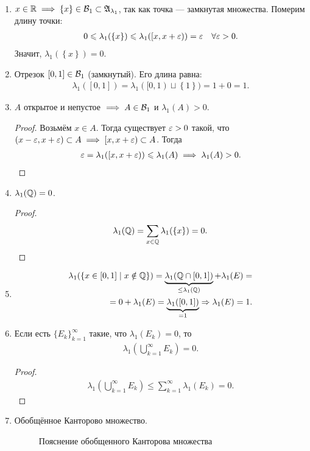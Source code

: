 \begin{exmpl}\
 \begin{enumerate}
  \item $x \in \mathbb{R} \implies \left\{ x \right\} \in \mathcal{B}_1 \subset \mathfrak{A}_{\lambda_1}$, так как точка --- замкнутая множества. Померим длину точки:
   \begin{align*}
    0 \leqslant \lambda_1(\left\{ x \right\}) \leqslant \lambda_1([x, x + \varepsilon)) = \varepsilon \quad \forall \varepsilon > 0
   .\end{align*} Значит, $\lambda_1(\left\{ x \right\}) = 0$.
  \item Отрезок $[0, 1] \in \mathcal{B}_1$ (замкнутый). Его длина равна:
   \begin{align*}
    \lambda_1([0,1]) = \lambda_1([0, 1) \sqcup \left\{ 1 \right\}) = 1 + 0 = 1
   .\end{align*}
  \item $A$ открытое и непустое $ \implies A \in \mathcal{B}_1$ и $\lambda_1(A) > 0$.
   \begin{proof}
    Возьмём $x \in A$. Тогда существует $\varepsilon > 0$ такой, что $(x - \varepsilon, x + \varepsilon) \subset A \implies [x, x + \varepsilon) \subset A$. Тогда
    \begin{align*}
     \varepsilon = \lambda_1( [x, x + \varepsilon) ) \leqslant \lambda_1(A) \implies \lambda_1(A) > 0
    .\end{align*}
   \end{proof}
  \item $\lambda_1(\mathbb{Q}) = 0$.
   \begin{proof}
    \begin{align*}
     \lambda_1(\mathbb{Q}) = \sum_{x \in \mathbb{Q}} \lambda_1(\left\{ x \right\}) = 0
    .\end{align*}
   \end{proof}
  \item \begin{align*}
		  \lambda_1( \left\{ x \in [0,1] \mid x \notin \mathbb{Q} \right\} ) = \underbrace{\lambda_1(\mathbb{Q} \cap [0, 1])}_{\leq \lambda_1(\mathbb{Q})} + \lambda_1(E) = \\
	= 0 + \lambda_1(E) = \underbrace{\lambda_1([0, 1])}_{=1} \Rightarrow \lambda_1(E) = 1
   .\end{align*}
  \item Если есть $\{E_{k}\}_{k=1}^{\infty} $ такие, что $\lambda_1(E_k) = 0$, то
   \begin{align*}
    \lambda_1 \left( \bigcup_{k=1}^{\infty} E_k \right) = 0
   .\end{align*}
   \begin{proof}
    \begin{align*}
     \lambda_1 \left( \bigcup_{k=1}^{\infty} E_k \right) \leqslant \sum_{k=1}^{\infty} \lambda_1(E_k) = 0
    .\end{align*}
   \end{proof}
  \item Обобщённое Канторово множество.
\begin{figure}[ht]
    \centering
	\caption{Пояснение обобщенного Канторова множества}
	\label{fig:пояснение-обобщенного-канторова-множества}
\end{figure}


\end{enumerate}
\end{exmpl}
